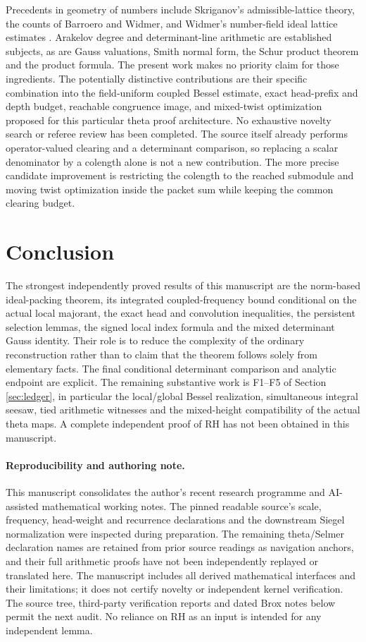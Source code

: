 \documentclass[11pt,a4paper]{article}
\begin{document}
Precedents in geometry of numbers include Skriganov's admissible-lattice theory, the counts of Barroero and Widmer, and Widmer's number-field ideal lattice estimates \cite{skriganov,barroero,widmerweak,widmercount}. Arakelov degree and determinant-line arithmetic are established subjects, as are Gauss valuations, Smith normal form, the Schur product theorem and the product formula. The present work makes no priority claim for those ingredients. The potentially distinctive contributions are their specific combination into the field-uniform coupled Bessel estimate, exact head-prefix and depth budget, reachable congruence image, and mixed-twist optimization proposed for this particular theta proof architecture. No exhaustive novelty search or referee review has been completed. The source itself already performs operator-valued clearing and a determinant comparison, so replacing a scalar denominator by a colength alone is not a new contribution. The more precise candidate improvement is restricting the colength to the reached submodule and moving twist optimization inside the packet sum while keeping the common clearing budget.

\section{Conclusion}
The strongest independently proved results of this manuscript are the norm-based ideal-packing theorem, its integrated coupled-frequency bound conditional on the actual local majorant, the exact head and convolution inequalities, the persistent selection lemmas, the signed local index formula and the mixed determinant Gauss identity. Their role is to reduce the complexity of the ordinary reconstruction rather than to claim that the theorem follows solely from elementary facts. The final conditional determinant comparison and analytic endpoint are explicit. The remaining substantive work is F1--F5 of Section \ref{sec:ledger}, in particular the local/global Bessel realization, simultaneous integral seesaw, tied arithmetic witnesses and the mixed-height compatibility of the actual theta maps. A complete independent proof of RH has not been obtained in this manuscript.

\paragraph{Reproducibility and authoring note.} This manuscript consolidates the author's recent research programme and AI-assisted mathematical working notes. The pinned readable source's scale, frequency, head-weight and recurrence declarations and the downstream Siegel normalization were inspected during preparation. The remaining theta/Selmer declaration names are retained from prior source readings as navigation anchors, and their full arithmetic proofs have not been independently replayed or translated here. The manuscript includes all derived mathematical interfaces and their limitations; it does not certify novelty or independent kernel verification. The source tree, third-party verification reports and dated Brox notes below permit the next audit. No reliance on RH as an input is intended for any independent lemma.
\end{document}
